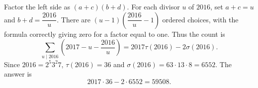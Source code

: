 Factor the left side as $(a+c)(b+d)$. For each divisor $u$ of $2016$, set $a+c=u$ and $b+d=\dfrac{2016}{u}$. There are $(u-1)(\dfrac{2016}{u}-1)$ ordered choices, with the formula correctly giving zero for a factor equal to one. Thus the count is
\[
\sum_{u\mid2016}\left(2017-u-\dfrac{2016}{u}\right)
=2017\tau(2016)-2\sigma(2016).
\]
Since $2016=2^5 3^2 7$, $\tau(2016)=36$ and $\sigma(2016)=63\cdot13\cdot8=6552$. The answer is
\[
\boxed{2017\cdot36-2\cdot6552=59508}.
\]
